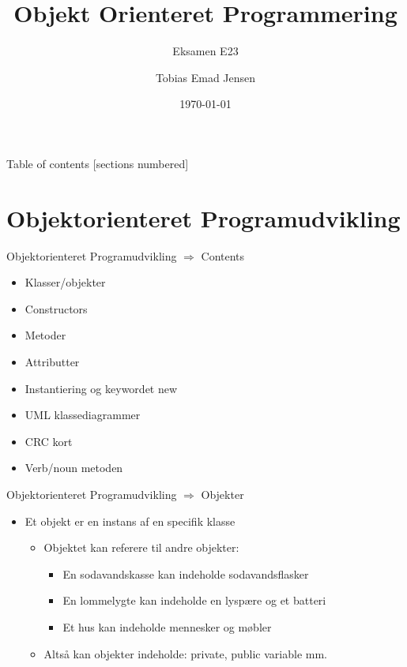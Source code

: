 \documentclass[10pt,aspectratio=1610]{beamer}
\title{Objekt Orienteret Programmering}
\subtitle{Eksamen E23}
\date{\today}
\author{Tobias Emad Jensen}
\institute{Univertity of Southern Denmark}
\begin{document}
\maketitle

\begin{frame}{Table of contents}
  [sections numbered]
  \tableofcontents[hideallsubsections]
\end{frame}




\section{Objektorienteret Programudvikling}

\begin{frame}{Objektorienteret Programudvikling $\Rightarrow$ Contents}
    \begin{itemize}
        \item Klasser/objekter
        \item Constructors
        \item Metoder
        \item Attributter
        \item Instantiering og keywordet \alert{new}
        \item UML klassediagrammer
        \item CRC kort
        \item Verb/noun metoden
    \end{itemize}
\end{frame}

\begin{frame}{Objektorienteret Programudvikling $\Rightarrow$ Objekter}
    \begin{itemize}
        \item Et objekt er en instans af en specifik klasse
        \begin{itemize}
            \item Objektet kan referere til andre objekter:
            \begin{itemize}
                \item En sodavandskasse kan indeholde sodavandsflasker
                \item En lommelygte kan indeholde en lyspære og et batteri
                \item Et hus kan indeholde mennesker og møbler
            \end{itemize}
            \item Altså kan objekter indeholde: private, public variable mm. 
        \end{itemize}
    \end{itemize}
\end{frame}
\end{document}
